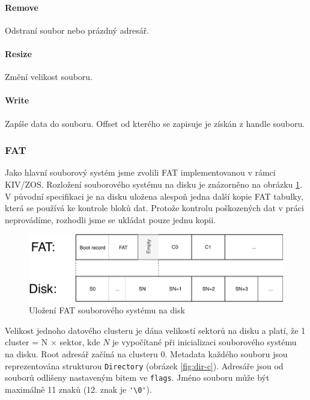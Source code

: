 \documentclass[11pt,a4paper]{scrartcl}
\begin{document}
	\paragraph{Remove}
	Odstraní soubor nebo prázdný adresář.
	
	\paragraph{Resize}
	Změní velikost souboru.
	
	\paragraph{Write}
	Zapíše data do souboru. Offset od kterého se zapisuje je získán z handle souboru.
	
	
	\subsubsection{FAT}
	
	Jako hlavní souborový systém jsme zvolili FAT implementovanou v rámci KIV/ZOS. Rozložení souborového systému na disku je znázorněno na obrázku \ref{fig:fat-disk-struct}. V původní specifikaci je na disku uložena alespoň jedna další kopie FAT tabulky, která se používá ke kontrole bloků dat. Protože kontrolu poškozených dat v práci neprovádíme, rozhodli jsme se ukládat pouze jednu kopii.
	
	\begin{figure}[H]
		\centering
		\includegraphics[width=12cm]{fat-rozdeleni-disku.pdf}
		\caption{Uložení FAT souborového systému na disk}
		\label{fig:fat-disk-struct}
	\end{figure}

	Velikost jednoho datového clusteru je dána velikostí sektorů na disku a platí, že 1 cluster = N $\times$ sektor, kde $N$ je vypočítané při inicializaci souborového systému na disku. Root adresář začíná na clusteru 0. Metadata každého souboru jsou reprezentována strukturou \verb|Directory| (obrázek \ref{fig:dir-c}). Adresáře jsou od souborů odlišeny nastaveným bitem ve \verb|flags|. Jméno souboru může být maximálně 11 znaků (12. znak je \verb|'\0'|).
	
\end{document}
